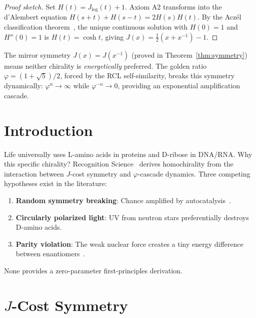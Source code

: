 \documentclass[12pt,a4paper]{article}
\theoremstyle{definition}
\theoremstyle{remark}
\begin{document}
\begin{proof}[Proof sketch]
Set $H(t) = J_{\log}(t)+1$.  Axiom A2 transforms into the d'Alembert
equation $H(s+t)+H(s-t)=2H(s)H(t)$.  By the Acz\'el classification
theorem~\cite{Aczel1966}, the unique continuous solution with $H(0)=1$
and $H''(0)=1$ is $H(t)=\cosh t$, giving
$J(x)=\tfrac{1}{2}(x+x^{-1})-1$.
\end{proof}

\noindent The mirror symmetry $J(x) = J(x^{-1})$ (proved in
Theorem~\ref{thm:symmetry}) means neither chirality is
\emph{energetically} preferred.  The golden ratio $\varphi=(1+\sqrt{5})/2$,
forced by the RCL self-similarity, breaks this symmetry dynamically:
$\varphi^n \to \infty$ while $\varphi^{-n} \to 0$, providing an
exponential amplification cascade.

\section{Introduction}
\label{sec:intro}

Life universally uses L-amino acids in proteins and D-ribose in
DNA/RNA.  Why this specific chirality?  Recognition
Science~\cite{RS_Axioms} derives homochirality from the interaction
between $J$-cost symmetry and $\varphi$-cascade dynamics.  Three
competing hypotheses exist in the literature:
\begin{enumerate}
  \item \textbf{Random symmetry breaking}: Chance amplified by
  autocatalysis~\cite{Kondepudi1981}.
  \item \textbf{Circularly polarized light}: UV from neutron stars
  preferentially destroys D-amino acids.
  \item \textbf{Parity violation}: The weak nuclear force creates a
  tiny energy difference between enantiomers~\cite{Hegstrom1980}.
\end{enumerate}

None provides a zero-parameter first-principles derivation.

\section{$J$-Cost Symmetry}
\label{sec:symmetry}
\end{document}
